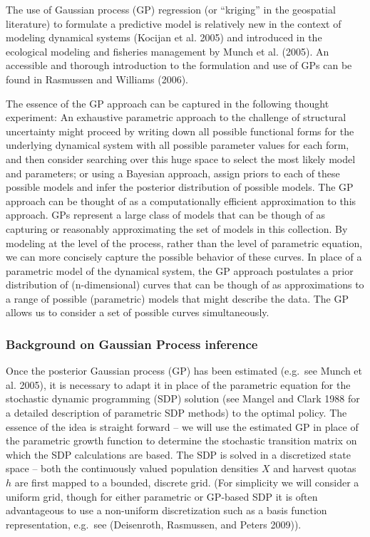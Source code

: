 \documentclass[author-year, review]{elsarticle} %
\begin{document}
The use of Gaussian process (GP) regression (or ``kriging'' in the
geospatial literature) to formulate a predictive model is relatively new
in the context of modeling dynamical systems (Kocijan et al. 2005) and
introduced in the ecological modeling and fisheries management by Munch
et al. (2005). An accessible and thorough introduction to the
formulation and use of GPs can be found in Rasmussen and Williams
(2006).

The essence of the GP approach can be captured in the following thought
experiment: An exhaustive parametric approach to the challenge of
structural uncertainty might proceed by writing down all possible
functional forms for the underlying dynamical system with all possible
parameter values for each form, and then consider searching over this
huge space to select the most likely model and parameters; or using a
Bayesian approach, assign priors to each of these possible models and
infer the posterior distribution of possible models. The GP approach can
be thought of as a computationally efficient approximation to this
approach. GPs represent a large class of models that can be though of as
capturing or reasonably approximating the set of models in this
collection. By modeling at the level of the process, rather than the
level of parametric equation, we can more concisely capture the possible
behavior of these curves. In place of a parametric model of the
dynamical system, the GP approach postulates a prior distribution of
(n-dimensional) curves that can be though of as approximations to a
range of possible (parametric) models that might describe the data. The
GP allows us to consider a set of possible curves simultaneously.

\subsubsection{Background on Gaussian Process inference}

Once the posterior Gaussian process (GP) has been estimated (e.g.~see
Munch et al. 2005), it is necessary to adapt it in place of the
parametric equation for the stochastic dynamic programming (SDP)
solution (see Mangel and Clark 1988 for a detailed description of
parametric SDP methods) to the optimal policy. The essence of the idea
is straight forward -- we will use the estimated GP in place of the
parametric growth function to determine the stochastic transition matrix
on which the SDP calculations are based. The SDP is solved in a
discretized state space -- both the continuously valued population
densities $X$ and harvest quotas $h$ are first mapped to a bounded,
discrete grid. (For simplicity we will consider a uniform grid, though
for either parametric or GP-based SDP it is often advantageous to use a
non-uniform discretization such as a basis function representation,
e.g.~see (Deisenroth, Rasmussen, and Peters 2009)).
\end{document}
